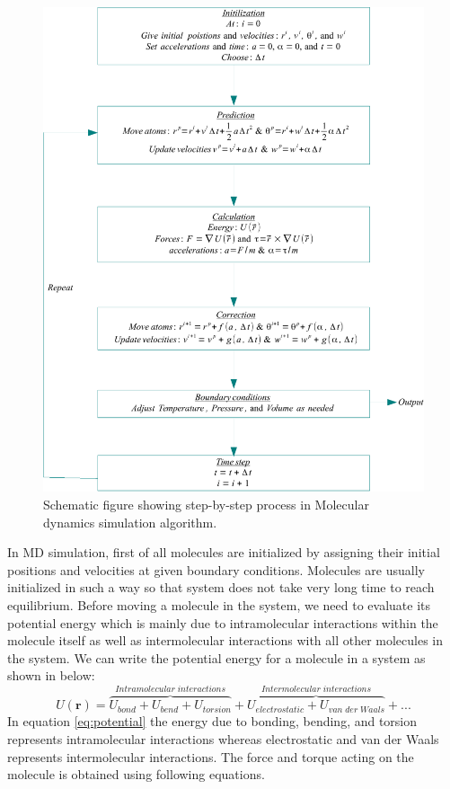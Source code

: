 \begin{figure}[tpb]
  \begin{center}
    \centerline{\includegraphics[scale=0.8]{MD_flowchart.pdf}}
    \caption{Schematic figure showing step-by-step process in Molecular dynamics simulation algorithm.}
    \label{fig:MD}
  \end{center}
\end{figure}

In MD simulation, first of all molecules are initialized by assigning their initial positions and velocities at given boundary conditions. Molecules are usually initialized in such a way so that system does not take very long time to reach equilibrium. Before moving a molecule in the system, we need to evaluate its potential energy which is mainly due to intramolecular interactions within the molecule itself as well as intermolecular interactions with all other molecules in the system. We can write the potential energy for a molecule in a system as shown in below:
\begin{equation}
U(\mathbf r) = \overbrace{U_{bond} + U_{bend} + U_{torsion}}^{Intramolecular\; interactions} + \overbrace{U_{electrostatic} + U_{van\;der \;Waals}}^{Intermolecular\;interactions} + ...
\label{eq:potential}
\end{equation}   
In equation \ref{eq:potential} the energy due to bonding, bending, and torsion represents intramolecular interactions whereas electrostatic and van der Waals represents intermolecular interactions. The force and torque acting on the molecule is obtained using following equations.

